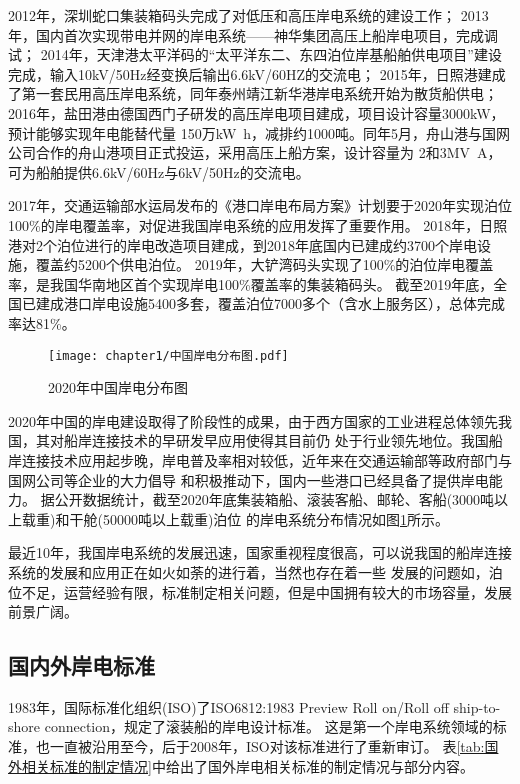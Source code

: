 2012年，深圳蛇口集装箱码头完成了对低压和高压岸电系统的建设工作；
2013年，国内首次实现带电并网的岸电系统——神华集团高压上船岸电项目，完成调试\cite{SP8}；
2014年，天津港太平洋码的“太平洋东二、东四泊位岸基船舶供电项目”建设完成，输入10kV/50Hz经变换后输出6.6kV/60HZ的交流电；
2015年，日照港建成了第一套民用高压岸电系统\cite{SP9}，同年泰州靖江新华港岸电系统开始为散货船供电；
2016年，盐田港由德国西门子研发的高压岸电项目建成，项目设计容量3000kW，预计能够实现年电能替代量
150万\si{kW.h}，减排约1000吨。同年5月，舟山港与国网公司合作的舟山港项目正式投运，采用高压上船方案，设计容量为
2和3\si{MV.A}，可为船舶提供6.6kV/60Hz与6kV/50Hz的交流电\cite{SP10}。

2017年，交通运输部水运局发布的《港口岸电布局方案》计划要于2020年实现泊位100\%的岸电覆盖率，对促进我国岸电系统的应用发挥了重要作用。
2018年，日照港对2个泊位进行的岸电改造项目建成，到2018年底国内已建成约3700个岸电设施，覆盖约5200个供电泊位。
2019年，大铲湾码头实现了100\%的泊位岸电覆盖率，是我国华南地区首个实现岸电100\%覆盖率的集装箱码头\cite{SP11}。
截至2019年底，全国已建成港口岸电设施5400多套，覆盖泊位7000多个（含水上服务区），总体完成率达81\%\cite{SP12}。

\begin{figure}[!htp]
	\centering
	\texttt{[image: chapter1/中国岸电分布图.pdf]}
	\caption{ 2020年中国岸电分布图}
	\label{fig:中国岸电分布图}
\end{figure}

2020年中国的岸电建设取得了阶段性的成果，由于西方国家的工业进程总体领先我国，其对船岸连接技术的早研发早应用使得其目前仍
处于行业领先地位。我国船岸连接技术应用起步晚，岸电普及率相对较低，近年来在交通运输部等政府部门与国网公司等企业的大力倡导
和积极推动下，国内一些港口已经具备了提供岸电能力。
据公开数据统计，截至2020年底集装箱船、滚装客船、邮轮、客船(3000吨以上载重)和干舱(50000吨以上载重)泊位
的岸电系统分布情况如图\ref{fig:中国岸电分布图}所示。

最近10年，我国岸电系统的发展迅速，国家重视程度很高，可以说我国的船岸连接系统的发展和应用正在如火如荼的进行着，当然也存在着一些
发展的问题如，泊位不足，运营经验有限，标准制定相关问题，但是中国拥有较大的市场容量，发展前景广阔。

\subsection{国内外岸电标准}

1983年，国际标准化组织(ISO)了ISO6812:1983 Preview Roll on/Roll off ship-to-shore connection，规定了滚装船的岸电设计标准。
这是第一个岸电系统领域的标准，也一直被沿用至今，后于2008年，ISO对该标准进行了重新审订\cite{SP4}。
表\ref{tab:国外相关标准的制定情况}中给出了国外岸电相关标准的制定情况与部分内容。
\begin{table}[!htp]
	\centering
	\caption[国外相关标准的制定情况]{国外相关标准的制定情况}
	\label{tab:国外相关标准的制定情况}
\end{table}

